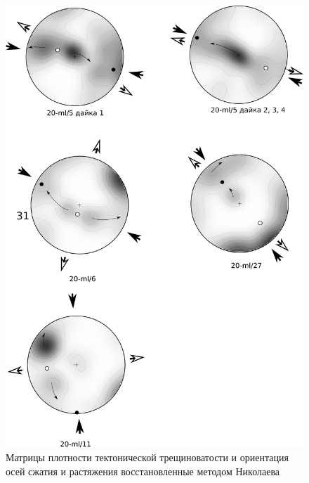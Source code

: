 \begin{figure}[H]
\begin{changemargin}{0cm}{0cm}
  \begin{center}
    \begin{minipage}[h]{0.6\linewidth}
        \includegraphics[width=1\textwidth]{authors/kondratev-fig2.png}
        \caption{Матрицы плотности тектонической трещиноватости и ориентация осей сжатия и растяжения восстановленные методом Николаева}
        \label{fig:kondratev-fig2}
    \end{minipage}
\hfill
    \begin{minipage}[h]{0.34\linewidth}
      \begin{center}

\end{center}
\end{minipage}
\end{center}
\end{changemargin}
\end{figure}
